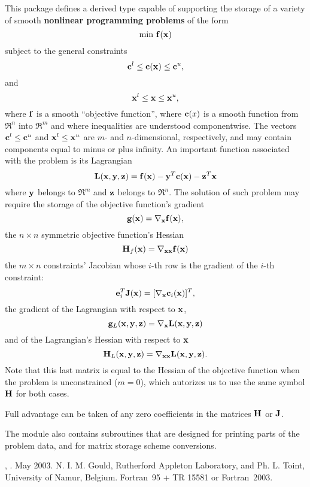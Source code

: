 \documentclass{galahad}
\newcommand{\packagename}{NLPT}
\newcommand{\fullpackagename}{\libraryname\_\packagename}
\begin{document}
\galheader


\galsummary
This package defines a derived type capable of supporting the storage of
a variety of smooth {\bf nonlinear programming problems} of the form
\[
\min \, {\mathbf{f}}({\mathbf{x}})
\]
subject to the general constraints
\[
{\mathbf{c}}^l \leq {\mathbf{c}}({\mathbf{x}}) \leq {\mathbf{c}}^u,
\]
and
\[
{\mathbf{x}}^l \leq {\mathbf{x}} \leq {\mathbf{x}}^u,
\]
where ${\mathbf{f}}$ is a smooth ``objective function'', where ${\mathbf{c}}(x)$ is a smooth
function from $\Re^n$ into $\Re^m$ and where inequalities are understood
componentwise. The vectors ${\mathbf{c}}^l \leq {\mathbf{c}}^u$ and ${\mathbf{x}}^l \leq {\mathbf{x}}^u$ are
$m$- and $n$-dimensional, respectively, and may contain components equal to
minus or plus infinity. An important function associated with the problem
is its Lagrangian
\[
{\mathbf{L}}( {\mathbf{x}},{\mathbf{y}}, {\mathbf{z}}) = {\mathbf{f}}({\mathbf{x}}) - {\mathbf{y}}^T{\mathbf{c}}({\mathbf{x}}) - {\mathbf{z}}^T{\mathbf{x}}
\]
where ${\mathbf{y}}$ belongs to $\Re^m$ and ${\mathbf{z}}$ belongs to $\Re^n$.
The solution of such problem may require the storage of the objective
function's gradient 
\[
{\mathbf{g}}({\mathbf{x}}) = \nabla_{{\mathbf{x}}} {\mathbf{f}}({\mathbf{x}}),
\]
the $n \times n$ symmetric objective function's Hessian
\[
{\mathbf{H}}_f({\mathbf{x}}) = \nabla_{{\mathbf{x}}{\mathbf{x}}} {\mathbf{f}}({\mathbf{x}})
\]
the $m \times n$ constraints' Jacobian whose $i$-th row is the 
gradient of the $i$-th constraint:
\[
{\mathbf{e}}_i^T {\mathbf{J}}({\mathbf{x}}) = [ \nabla_{{\mathbf{x}}} {\mathbf{c}}_i({\mathbf{x}}) ]^T,
\]
the gradient of the Lagrangian with respect to ${\mathbf{x}}$,
\[
{\mathbf{g}}_L({\mathbf{x}},{\mathbf{y}},{\mathbf{z}}) = \nabla_{{\mathbf{x}}} {\mathbf{L}}( {\mathbf{x}},{\mathbf{y}}, {\mathbf{z}})
\]
and of the Lagrangian's Hessian with respect to ${\mathbf{x}}$
\[
{\mathbf{H}}_L({\mathbf{x}},{\mathbf{y}},{\mathbf{z}}) = \nabla_{{\mathbf{x}}{\mathbf{x}}} {\mathbf{L}}( {\mathbf{x}},{\mathbf{y}}, {\mathbf{z}}).
\]
Note that this last matrix is equal to the Hessian of the objective function
when the problem is unconstrained ($m=0$), which autorizes us
to use the same symbol ${\mathbf{H}}$ for both cases.

\noindent
Full advantage can be taken of any zero coefficients in the matrices ${\mathbf{H}}$ 
or ${\mathbf{J}}$.

\noindent
The module also contains subroutines that are designed for printing parts 
of the problem data, and for matrix storage scheme conversions. 


\galattributes
\galversions{\tt  \fullpackagename\_single, \fullpackagename\_double},
.
\galdate May 2003.
\galorigin N. I. M. Gould, Rutherford Appleton Laboratory, and
Ph. L. Toint, University of Namur, Belgium.
\gallanguage Fortran~95 + TR 15581 or Fortran~2003. 
\end{document}
